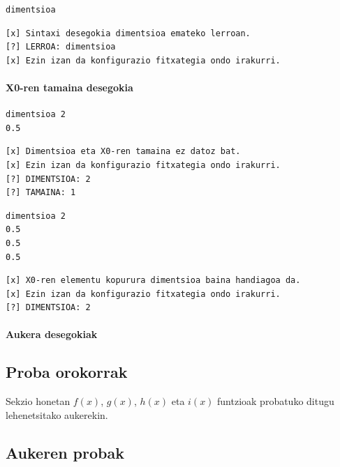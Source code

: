 \documentclass[10pt,a4paper,basque]{article}
\begin{document}
\begin{verbatim}
dimentsioa
\end{verbatim}

\begin{verbatim}
[x] Sintaxi desegokia dimentsioa emateko lerroan.
[?] LERROA: dimentsioa
[x] Ezin izan da konfigurazio fitxategia ondo irakurri.
\end{verbatim}

\paragraph{X0-ren tamaina desegokia}

\begin{verbatim}
dimentsioa 2
0.5
\end{verbatim}

\begin{verbatim}
[x] Dimentsioa eta X0-ren tamaina ez datoz bat.
[x] Ezin izan da konfigurazio fitxategia ondo irakurri.
[?] DIMENTSIOA: 2
[?] TAMAINA: 1
\end{verbatim}

\begin{verbatim}
dimentsioa 2
0.5
0.5
0.5
\end{verbatim}

\begin{verbatim}
[x] X0-ren elementu kopurura dimentsioa baina handiagoa da.
[x] Ezin izan da konfigurazio fitxategia ondo irakurri.
[?] DIMENTSIOA: 2
\end{verbatim}

\paragraph{Aukera desegokiak}

\subsection{Proba orokorrak}

Sekzio honetan $f(x)$, $g(x)$, $h(x)$ eta $i(x)$ funtzioak probatuko ditugu lehenetsitako aukerekin.

\subsection{Aukeren probak}
\end{document}
